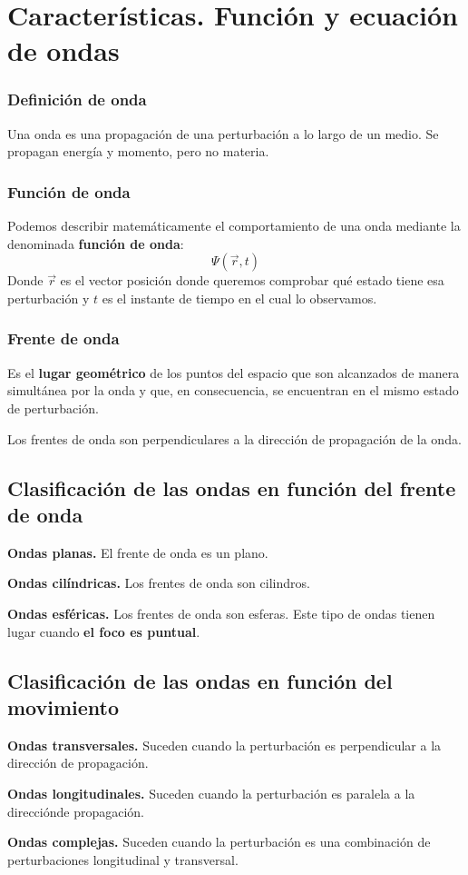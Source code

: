 \documentclass[a4paper]{book}
\begin{document}
\section{Características. Función y ecuación de ondas}

\subsubsection{Definición de onda}
Una onda es una propagación de una perturbación a lo largo de un medio. Se propagan energía y momento, pero no materia.

\subsubsection{Función de onda}
Podemos describir matemáticamente el comportamiento de una onda mediante la denominada \textbf{función de onda}:
\[\Psi\left(\vec{r},t\right)\]
Donde $\vec{r}$ es el vector posición donde queremos comprobar qué estado tiene esa perturbación y $t$ es el instante de tiempo en el cual lo observamos.

\subsubsection{Frente de onda}
Es el \textbf{lugar geométrico} de los puntos del espacio que son alcanzados de manera simultánea por la onda y que, en consecuencia, se encuentran en el mismo estado de perturbación.

Los frentes de onda son perpendiculares a la dirección de propagación de la onda.

\subsection{Clasificación de las ondas en función del frente de onda}
\begin{myenumerate}
	\item \textbf{Ondas planas.} El frente de onda es un plano.
	\item  \textbf{Ondas cilíndricas.} Los frentes de onda son cilindros.
	\item \textbf{Ondas esféricas.} Los frentes de onda son esferas. Este tipo de ondas tienen lugar cuando \textbf{el foco es puntual}.
\end{myenumerate}

\subsection{Clasificación de las ondas en función del movimiento}
\begin{myenumerate}
	\item \textbf{Ondas transversales.} Suceden cuando la perturbación es perpendicular a la dirección de propagación.
	\item  \textbf{Ondas longitudinales.} Suceden cuando la perturbación es paralela a la direcciónde propagación.
	\item \textbf{Ondas complejas.} Suceden cuando la perturbación es una combinación de perturbaciones longitudinal y transversal.
\end{myenumerate}
\end{document}
